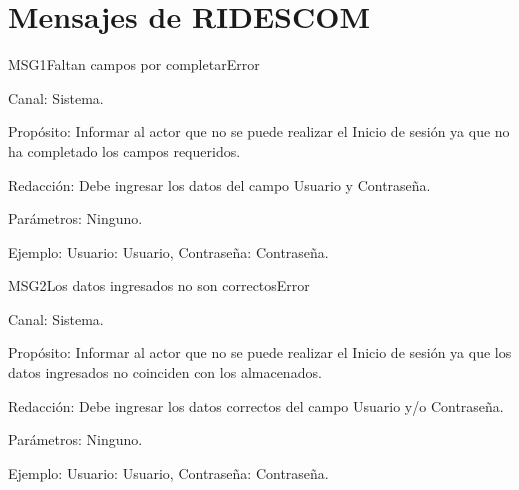\section{Mensajes de RIDESCOM}


\begin{mensaje}{MSG1}{Faltan campos por completar}{Error}

	\item[Canal:] Sistema.

    \item[Propósito:] Informar al actor que no se puede realizar el Inicio de sesión ya que no ha completado los campos requeridos.

    \item[Redacción:] Debe ingresar los datos del campo Usuario y Contraseña.

    \item[Parámetros:] Ninguno.

    \item[Ejemplo:] Usuario: Usuario, Contraseña: Contraseña.


\end{mensaje}
\newline



\begin{mensaje}{MSG2}{Los datos ingresados no son correctos}{Error}
	
	\item[Canal:] Sistema.
	
	\item[Propósito:] Informar al actor que no se puede realizar el Inicio de sesión ya que los datos ingresados no coinciden con los almacenados.
	
	\item[Redacción:] Debe ingresar los datos correctos del campo Usuario y/o Contraseña.
	
	\item[Parámetros:] Ninguno.
	
	\item[Ejemplo:] Usuario: Usuario, Contraseña: Contraseña.
	
	
\end{mensaje}
